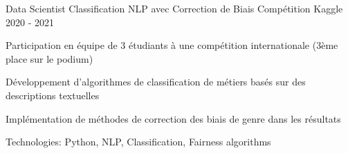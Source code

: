\begin{cventries}
\cventry
{Data Scientist} %
{Classification NLP avec Correction de Biais} %
{Compétition Kaggle} %
{2020 - 2021} %
{ %
\begin{cvitems}
\item {Participation en équipe de 3 étudiants à une compétition internationale (3ème place sur le podium)}
\item {Développement d'algorithmes de classification de métiers basés sur des descriptions textuelles}
\item {Implémentation de méthodes de correction des biais de genre dans les résultats}
\item {Technologies: Python, NLP, Classification, Fairness algorithms}
\end{cvitems}
}


\end{cventries}